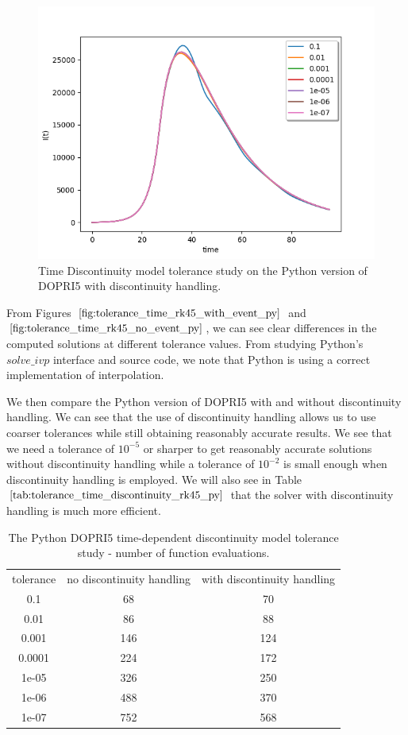 \begin{figure}[H]
\centering
\includegraphics[width=0.7\linewidth]{./figures/tolerance_time_rk45_with_event_py}
\caption{Time Discontinuity model tolerance study on the Python version of DOPRI5 with discontinuity handling.}
\label{fig:tolerance_time_rk45_with_event_py}
\end{figure}

From Figures $\ref{fig:tolerance_time_rk45_with_event_py}$ and $\ref{fig:tolerance_time_rk45_no_event_py}$, we can see clear differences in the computed solutions at different tolerance values. From studying Python's $solve\_ivp$ interface and source code, we note that Python is using a correct implementation of interpolation.

We then compare the Python version of DOPRI5 with and without discontinuity handling. We can see that the use of discontinuity handling allows us to use coarser tolerances while still obtaining reasonably accurate results. We see that we need a tolerance of $10^{-5}$ or sharper to get reasonably accurate solutions without discontinuity handling while a tolerance of $10^{-2}$ is small enough when discontinuity handling is employed. We will also see in Table $\ref{tab:tolerance_time_discontinuity_rk45_py}$ that the solver with discontinuity handling is much more efficient.


\begin{table}[H]
\caption {The Python DOPRI5 time-dependent discontinuity model tolerance study - number of function evaluations.} \label{tab:tolerance_time_discontinuity_rk45_py} 
\begin{center}
\begin{tabular}{ c c c }
tolerance & no discontinuity handling & with discontinuity handling \\ 
0.1 & 68 & 70 \\
0.01 & 86 & 88 \\
0.001 & 146 & 124 \\
0.0001& 224 & 172 \\
1e-05 & 326 & 250 \\
1e-06 & 488 & 370 \\
1e-07 & 752 & 568 \\
\end{tabular}
\end{center}
\end{table}

